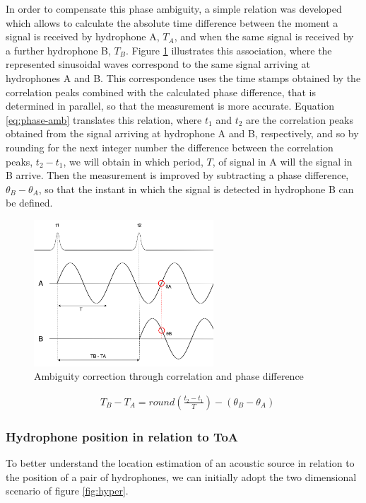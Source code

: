 In order to compensate this phase ambiguity, a simple relation was developed which allows to calculate the absolute time difference between the moment a signal is received by hydrophone A, $T_A$, and when the same signal is received by a further hydrophone B, $T_B$. Figure \ref{fig:ambiguity} illustrates this association, where the represented sinusoidal waves correspond to the same signal arriving at hydrophones A and B. This correspondence uses the time stamps obtained by the correlation peaks combined with the calculated phase difference, that is determined in parallel, so that the measurement is more accurate. Equation \ref{eq:phase-amb} translates this relation, where $t_1$ and $t_2$ are the correlation peaks obtained from the signal arriving at hydrophone A and B, respectively, and so by rounding for the next integer number the difference between the correlation peaks, $t_2 - t_1$, we will obtain in which period, $T$, of signal in A will the signal in B arrive. Then the measurement is improved by subtracting a phase difference, $\theta_B - \theta_A$, so that the instant in which the signal is detected in hydrophone B can be defined. 

\begin{figure}[!htbp]
	\centering
	\includegraphics[width=0.6\textwidth]{figures/ambiguity}
	\captionsetup{justification=centering,margin=2cm}
	\caption{Ambiguity correction through correlation and phase difference}
	\label{fig:ambiguity}
\end{figure}

\begin{eqnarray}
& T_B - T_A = round(\frac{t_2-t_1}{T}) - (\theta_B - \theta_A)
\label{eq:phase-amb}
\end{eqnarray}

\subsubsection{Hydrophone position in relation to ToA}
To better understand the location estimation of an acoustic source in relation to the position of a pair of hydrophones, we can initially adopt the two dimensional scenario of figure \ref{fig:hyper}. 

